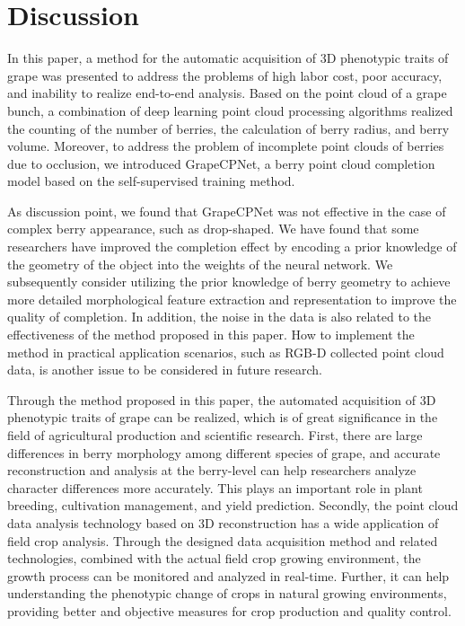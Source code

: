 \documentclass[12pt]{article}
\begin{document}
\section{Discussion}

\added{}

In this paper, a method for the automatic acquisition of 3D phenotypic traits of grape was presented to address the problems of high labor cost, poor accuracy, and inability to realize end-to-end analysis. 
Based on the point cloud of a grape bunch, a combination of deep learning point cloud processing algorithms realized the counting of the number of berries, the calculation of berry radius, and berry volume. 
Moreover, to address the problem of incomplete point clouds of berries due to occlusion, we introduced GrapeCPNet, a berry point cloud completion model based on the self-supervised training method.

As discussion point, we found that GrapeCPNet was not effective in the case of complex berry appearance, such as drop-shaped. 
We have found that some researchers \citep{pan_panoptic_2023,magistri_efficient_2024} have improved the completion effect by encoding a prior knowledge of the geometry of the object into the weights of the neural network. 
We subsequently consider utilizing the prior knowledge of berry geometry to achieve more detailed morphological feature extraction and representation to improve the quality of completion. 
In addition, the noise in the data is also related to the effectiveness of the method proposed in this paper. 
How to implement the method in practical application scenarios, such as RGB-D collected point cloud data, is another issue to be considered in future research. 

Through the method proposed in this paper, the automated acquisition of 3D phenotypic traits of grape can be realized, which is of great significance in the field of agricultural production and scientific research. 
First, there are large differences in berry morphology among different species of grape, and accurate reconstruction and analysis at the berry-level can help researchers analyze character differences more accurately. 
This plays an important role in plant breeding, cultivation management, and yield prediction. 
Secondly, the point cloud data analysis technology based on 3D reconstruction has a wide application of field crop analysis. 
Through the designed data acquisition method and related technologies, combined with the actual field crop growing environment, the growth process can be monitored and analyzed in real-time. 
Further, it can help understanding the phenotypic change of crops in natural growing environments, providing better and objective measures for crop production and quality control. 
\end{document}
